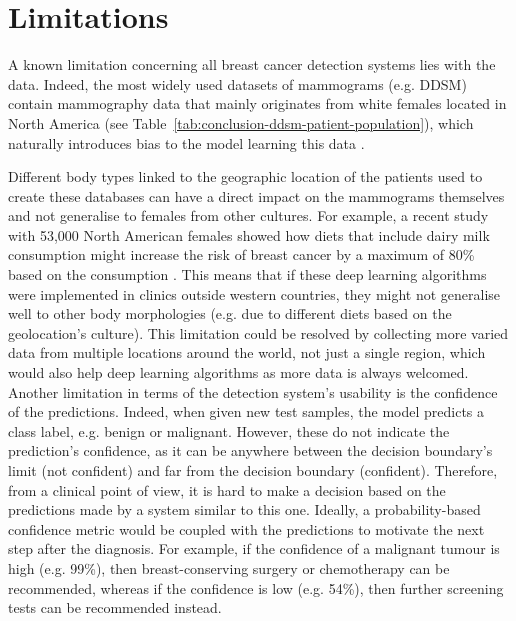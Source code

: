 
\section{Limitations}
\label{sec:conclusions-limitations}

A known limitation concerning all breast cancer detection systems lies with the data. Indeed, the most widely used datasets of mammograms (e.g. DDSM) contain mammography data that mainly originates from white females located in North America (see Table~\ref{tab:conclusion-ddsm-patient-population}), which naturally introduces bias to the model learning this data \citep{Yala2019}.



Different body types linked to the geographic location of the patients used to create these databases can have a direct impact on the mammograms themselves and not generalise to females from other cultures. For example, a recent study with 53,000 North American females showed how diets that include dairy milk consumption might increase the risk of breast cancer by a maximum of 80\% based on the consumption \citep{Fraser2020}. This means that if these deep learning algorithms were implemented in clinics outside western countries, they might not generalise well to other body morphologies (e.g. due to different diets based on the geolocation's culture). This limitation could be resolved by collecting more varied data from multiple locations around the world, not just a single region, which would also help deep learning algorithms as more data is always welcomed.\\

Another limitation in terms of the detection system's usability is the confidence of the predictions. Indeed, when given new test samples, the model predicts a class label, e.g. benign or malignant. However, these do not indicate the prediction's confidence, as it can be anywhere between the decision boundary's limit (not confident) and far from the decision boundary (confident). Therefore, from a clinical point of view, it is hard to make a decision based on the predictions made by a system similar to this one. Ideally, a probability-based confidence metric would be coupled with the predictions to motivate the next step after the diagnosis. For example, if the confidence of  a malignant tumour is high (e.g. 99\%),  then breast-conserving surgery or chemotherapy can be recommended, whereas if the confidence is low (e.g. 54\%), then further screening tests can be recommended instead.\\

